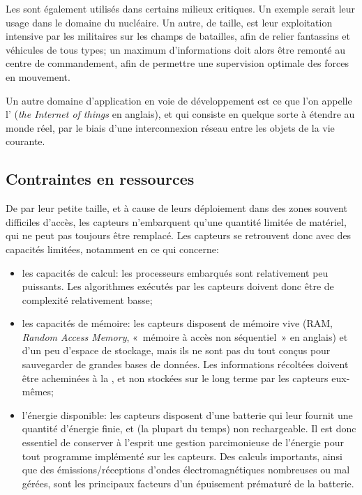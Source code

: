 Les \rcsfs sont également utilisés dans certains milieux critiques.
Un exemple serait leur usage dans le domaine du nucléaire.
Un autre, de taille, est leur exploitation intensive par les militaires sur les champs de batailles, afin de relier fantassins et véhicules de tous types; un maximum d'informations doit alors être remonté au centre de commandement, afin de permettre une supervision optimale des forces en mouvement.

Un autre domaine d'application en voie de développement est ce que l'on appelle l'\textit{} (\textit{the Internet of things} en anglais), et qui consiste en quelque sorte à étendre  au monde réel, par le biais d'une interconnexion réseau entre les objets de la vie courante.

    \subsection{Contraintes en ressources}
De par leur petite taille, et à cause de leurs déploiement dans des zones souvent difficiles d'accès, les capteurs n'embarquent qu'une quantité limitée de matériel, qui ne peut pas toujours être remplacé.
Les capteurs se retrouvent donc avec des capacités limitées, notamment en ce qui concerne:
\begin{itemize}
    \item les capacités de calcul: les processeurs embarqués sont relativement peu puissants.
        Les algorithmes exécutés par les capteurs doivent donc être de complexité relativement basse;
    \item les capacités de mémoire: les capteurs disposent de mémoire vive (RAM, \textit{Random Access Memory}, « mémoire à accès non séquentiel » en anglais) et d'un peu d'espace de stockage, mais ils ne sont pas du tout conçus pour sauvegarder de grandes bases de données.
        Les informations récoltées doivent être acheminées à la \sdb, et non stockées sur le long terme par les capteurs eux-mêmes;
    \item l'énergie disponible: les capteurs disposent d'une batterie qui leur fournit une quantité d'énergie finie, et (la plupart du temps) non rechargeable.
        Il est donc essentiel de conserver à l'esprit une gestion parcimonieuse de l'énergie pour tout programme implémenté sur les capteurs.
        Des calculs importants, ainsi que des émissions/réceptions d'ondes électromagnétiques nombreuses ou mal gérées, sont les principaux facteurs d'un épuisement prématuré de la batterie.
\end{itemize}

